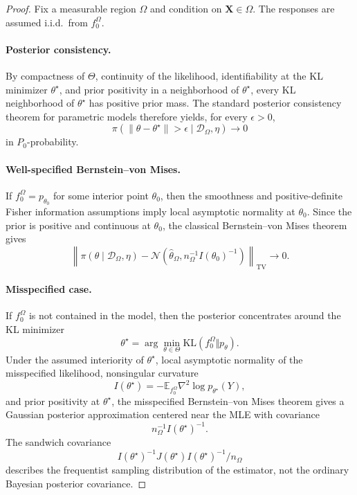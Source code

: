 \begin{proof}
Fix a measurable region $\Omega$ and condition on $\mathbf{X}\in\Omega$.
The responses are assumed i.i.d.\ from $f_0^\Omega$.

\paragraph{Posterior consistency.}
By compactness of $\Theta$, continuity of the likelihood, identifiability at the KL minimizer $\theta^\star$, and prior positivity in a neighborhood of $\theta^\star$, every KL neighborhood of $\theta^\star$ has positive prior mass.
The standard posterior consistency theorem for parametric models \citep[][Ch.~4]{ghosh2003bayesian} therefore yields, for every $\epsilon>0$,
\[
\pi(
\|\theta-\theta^\star\|>\epsilon
\mid
\mathcal{D}_\Omega,\eta
)
\to 0
\]
in $P_0$-probability.

\paragraph{Well-specified Bernstein--von Mises.}
If $f_0^\Omega=p_{\theta_0}$ for some interior point $\theta_0$, then the smoothness and positive-definite Fisher information assumptions imply local asymptotic normality at $\theta_0$.
Since the prior is positive and continuous at $\theta_0$, the classical Bernstein--von Mises theorem \citep[][Thm.~10.1]{van2000asymptotic} gives
\[
\left\|
\pi(\theta\mid\mathcal{D}_\Omega,\eta)
-
\mathcal{N}\!\left(
\hat{\theta}_\Omega,
n_\Omega^{-1}I(\theta_0)^{-1}
\right)
\right\|_{\mathrm{TV}}
\to 0.
\]

\paragraph{Misspecified case.}
If $f_0^\Omega$ is not contained in the model, then the posterior concentrates around the KL minimizer
\[
\theta^\star
=
\arg\min_{\theta\in\Theta}
\mathrm{KL}(f_0^\Omega\Vert p_\theta).
\]
Under the assumed interiority of $\theta^\star$, local asymptotic normality of the misspecified likelihood, nonsingular curvature
\[
I(\theta^\star)
=
-\mathbb{E}_{f_0^\Omega}
\nabla^2\log p_{\theta^\star}(Y),
\]
and prior positivity at $\theta^\star$, the misspecified Bernstein--von Mises theorem \citep{kleijn2012bernstein} gives a Gaussian posterior approximation centered near the MLE with covariance
\[
n_\Omega^{-1}I(\theta^\star)^{-1}.
\]
The sandwich covariance \citep{white1982maximum}
\[
I(\theta^\star)^{-1}
J(\theta^\star)
I(\theta^\star)^{-1}/n_\Omega
\]
describes the frequentist sampling distribution of the estimator, not the ordinary Bayesian posterior covariance.


\end{proof}
